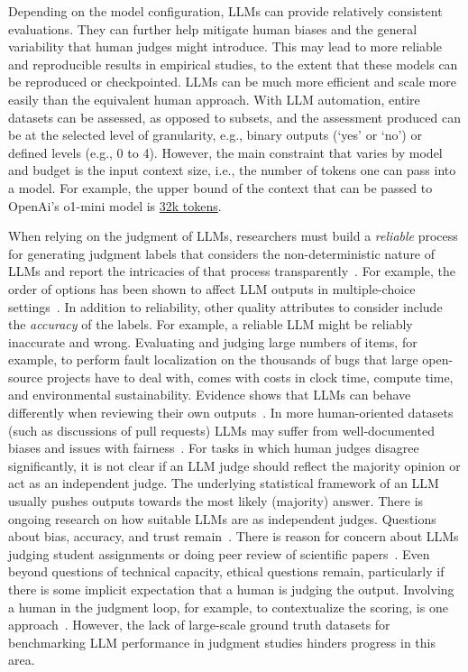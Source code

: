 
Depending on the model configuration, LLMs can provide relatively consistent evaluations.
They can further help mitigate human biases and the general variability that human judges might introduce.
This may lead to more reliable and reproducible results in empirical studies, to the extent that these models can be reproduced or checkpointed.
LLMs can be much more efficient and scale more easily than the equivalent human approach.
With LLM automation, entire datasets can be assessed, as opposed to subsets, and the assessment produced can be at the selected level of granularity, e.g., binary outputs (`yes' or `no') or defined levels (e.g., 0 to 4).
However, the main constraint that varies by model and budget is the input context size, i.e., the number of tokens one can pass into a model.
For example, the upper bound of the context that can be passed to OpenAi's \textsf{o1-mini} model is \href{https://help.openai.com/en/articles/9855712-openai-o1-models-faq-chatgpt-enterprise-and-edu}{32k tokens}.


When relying on the judgment of LLMs, researchers must build a \textit{reliable} process for generating judgment labels that considers the non-deterministic nature of LLMs and report the intricacies of that process transparently~\cite{DBLP:journals/corr/abs-2412-12509}.
For example, the order of options has been shown to affect LLM outputs in multiple-choice settings~\cite{DBLP:conf/naacl/PezeshkpourH24}. 
In addition to reliability, other quality attributes to consider include the \textit{accuracy} of the labels. %
For example, a reliable LLM might be reliably inaccurate and wrong. 
Evaluating and judging large numbers of items, for example, to perform fault localization on the thousands of bugs that large open-source projects have to deal with, comes with costs in clock time, compute time, and environmental sustainability.
Evidence shows that LLMs can behave differently when reviewing their own outputs~\cite{NEURIPS2024_7f1f0218}.
In more human-oriented datasets (such as discussions of pull requests) LLMs may suffer from well-documented biases and issues with fairness~\cite{Gallegos2024BiasAF}. 
For tasks in which human judges disagree significantly, it is not clear if an LLM judge should reflect the majority opinion or act as an independent judge.
The underlying statistical framework of an LLM usually pushes outputs towards the most likely (majority) answer. 
There is ongoing research on how suitable LLMs are as independent judges.
Questions about bias, accuracy, and trust remain~\cite{DBLP:journals/corr/abs-2406-18403}.
There is reason for concern about LLMs judging student assignments or doing peer review of scientific papers~\cite{DBLP:conf/coling/ZhouC024}.
Even beyond questions of technical capacity, ethical questions remain, particularly if there is some implicit expectation that a human is judging the output.
Involving a human in the judgment loop, for example, to contextualize the scoring, is one approach~\cite{panHumanCenteredDesignRecommendations2024}. 
However, the lack of large-scale ground truth datasets for benchmarking LLM performance in judgment studies hinders progress in this area.
